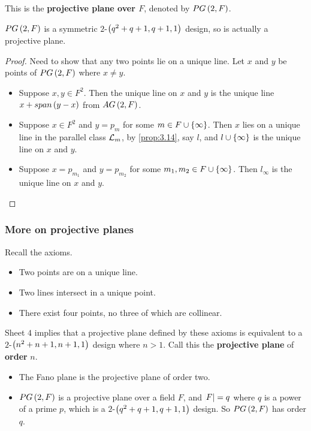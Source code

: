 \begin{definition*}
This is the \textbf{projective plane over $ F $}, denoted by $ PG\br{2, F} $.
\end{definition*}

\begin{proposition}
$ PG\br{2, F} $ is a symmetric $ 2 $-$ \br{q^2 + q + 1, q + 1, 1} $ design, so is actually a projective plane.
\end{proposition}

\begin{proof}
Need to show that any two points lie on a unique line. Let $ x $ and $ y $ be points of $ PG\br{2, F} $ where $ x \ne y $.
\begin{itemize}
\item Suppose $ x, y \in F^2 $. Then the unique line on $ x $ and $ y $ is the unique line $ x + span\br{y - x} $ from $ AG\br{2, F} $.
\item Suppose $ x \in F^2 $ and $ y = p_m $ for some $ m \in F \cup \cbr{\infty} $. Then $ x $ lies on a unique line in the parallel class $ \mathcal{L}_m $, by \ref{prop:3.14}, say $ l $, and $ l \cup \cbr{\infty} $ is the unique line on $ x $ and $ y $.
\item Suppose $ x = p_{m_1} $ and $ y = p_{m_2} $ for some $ m_1, m_2 \in F \cup \cbr{\infty} $. Then $ l_\infty $ is the unique line on $ x $ and $ y $.
\end{itemize}
\end{proof}

\pagebreak

\subsubsection{More on projective planes}


Recall the axioms.
\begin{itemize}
\item Two points are on a unique line.
\item Two lines intersect in a unique point.
\item There exist four points, no three of which are collinear.
\end{itemize}
Sheet $ 4 $ implies that a projective plane defined by these axioms is equivalent to a $ 2 $-$ \br{n^2 + n + 1, n + 1, 1} $ design where $ n > 1 $. Call this the \textbf{projective plane} of \textbf{order} $ n $.

\begin{example*}
\hfill
\begin{itemize}
\item The Fano plane is the projective plane of order two.
\item $ PG\br{2, F} $ is a projective plane over a field $ F $, and $ \abs{F} = q $ where $ q $ is a power of a prime $ p $, which is a $ 2 $-$ \br{q^2 + q + 1, q + 1, 1} $ design. So $ PG\br{2, F} $ has order $ q $.
\end{itemize}
\end{example*}

